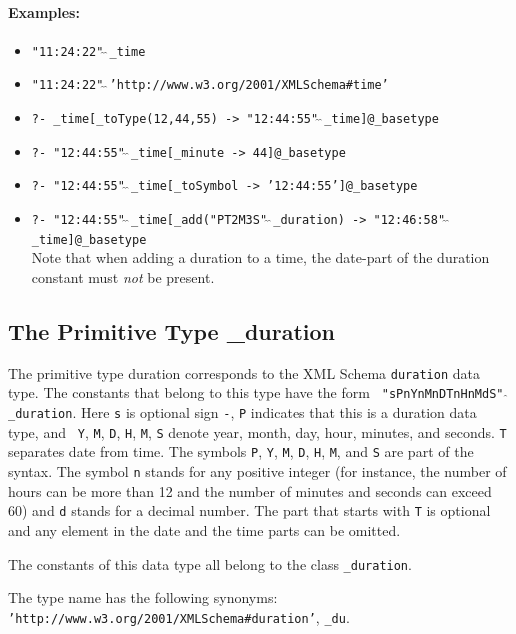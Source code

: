\documentclass[11pt]{article}
\begin{document}
\paragraph{Examples:}
\begin{itemize}
\item {\tt "11:24:22"$\hat{~}\hat{~}$\_time}
\item {\tt "11:24:22"$\hat{~}\hat{~}$'http://www.w3.org/2001/XMLSchema\#time'}
\item {\tt ?- \_time[\_toType(12,44,55) ->
    "12:44:55"$\hat{~}\hat{~}$\_time]@\_basetype}
\item {\tt ?- "12:44:55"$\hat{~}\hat{~}$\_time[\_minute -> 44]@\_basetype}
\item {\tt ?- "12:44:55"$\hat{~}\hat{~}$\_time[\_toSymbol -> '12:44:55']@\_basetype}
\item {\tt ?- "12:44:55"$\hat{~}\hat{~}$\_time[\_add("PT2M3S"$\hat{~}\hat{~}$\_duration) -> "12:46:58"$\hat{~}\hat{~}$\_time]@\_basetype }\\
  Note that when adding a duration to a time, the date-part of the duration
  constant must \emph{not} be present. 
\end{itemize}

\subsection{ The Primitive Type \_duration}

The primitive type duration corresponds to the XML Schema {\tt duration}
data type. The constants that belong to this type have the form {\tt
  "sPnYnMnDTnHnMdS"$\hat{~}\hat{~}$\_duration}.  Here {\tt s} is optional
sign {\tt -}, {\tt P} indicates that this is a duration data type, and {\tt
  Y}, {\tt M}, {\tt D}, {\tt H}, {\tt M}, {\tt S} denote year, month, day,
hour, minutes, and seconds. {\tt T} separates date from time. The symbols
{\tt P}, {\tt Y}, {\tt M}, {\tt D}, {\tt H}, {\tt M}, and {\tt S} are part
of the syntax.  The symbol {\tt n} stands for any positive integer (for
instance, the number of hours can be more than 12 and the number of minutes
and seconds can exceed 60) and {\tt d} stands for a decimal number. The part that starts with {\tt T}  is optional
and any element in the date and the time parts can be omitted.

The constants of this data type all belong to the class {\tt \_duration}. 

The type name has the following synonyms:
{\tt 'http://www.w3.org/2001/XMLSchema\#duration'},
{\tt \_du}.
\end{document}

